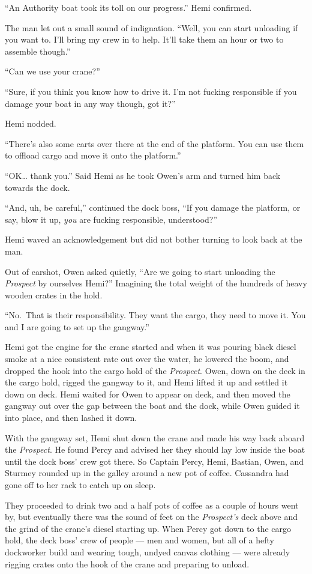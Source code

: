 \documentclass[]{scrbook}
\begin{document}
``An Authority boat took its toll on our progress.'' Hemi confirmed.

The man let out a small sound of indignation. ``Well, you can start
unloading if you want to. I'll bring my crew in to help. It'll take them
an hour or two to assemble though.''

``Can we use your crane?''

``Sure, if you think you know how to drive it. I'm not fucking
responsible if you damage your boat in any way though, got it?''

Hemi nodded.

``There's also some carts over there at the end of the platform. You can
use them to offload cargo and move it onto the platform.''

``OK\ldots{} thank you.'' Said Hemi as he took Owen's arm and turned him
back towards the dock.

``And, uh, be careful,'' continued the dock boss, ``If you damage the
platform, or say, blow it up, \emph{you} are fucking responsible,
understood?''

Hemi waved an acknowledgement but did not bother turning to look back at
the man.

Out of earshot, Owen asked quietly, ``Are we going to start unloading
the \emph{Prospect} by ourselves Hemi?'' Imagining the total weight of
the hundreds of heavy wooden crates in the hold.

``No.~That is their responsibility. They want the cargo, they need to
move it. You and I are going to set up the gangway.''

Hemi got the engine for the crane started and when it was pouring black
diesel smoke at a nice consistent rate out over the water, he lowered
the boom, and dropped the hook into the cargo hold of the
\emph{Prospect}. Owen, down on the deck in the cargo hold, rigged the
gangway to it, and Hemi lifted it up and settled it down on deck. Hemi
waited for Owen to appear on deck, and then moved the gangway out over
the gap between the boat and the dock, while Owen guided it into place,
and then lashed it down.

With the gangway set, Hemi shut down the crane and made his way back
aboard the \emph{Prospect}. He found Percy and advised her they should
lay low inside the boat until the dock boss' crew got there. So Captain
Percy, Hemi, Bastian, Owen, and Sturmey rounded up in the galley around
a new pot of coffee. Cassandra had gone off to her rack to catch up on
sleep.

They proceeded to drink two and a half pots of coffee as a couple of
hours went by, but eventually there was the sound of feet on the
\emph{Prospect's} deck above and the grind of the crane's diesel
starting up. When Percy got down to the cargo hold, the deck boss' crew
of people --- men and women, but all of a hefty dockworker build and
wearing tough, undyed canvas clothing --- were already rigging crates
onto the hook of the crane and preparing to unload.
\end{document}

